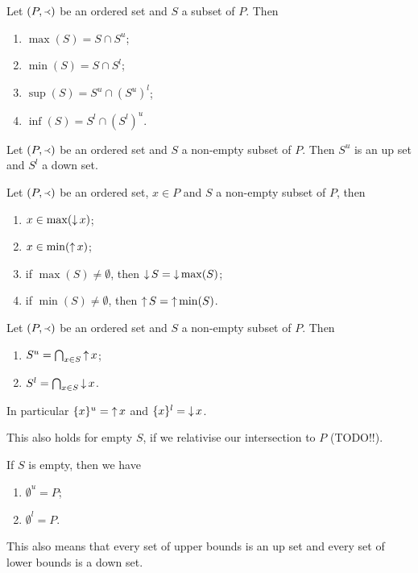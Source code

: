 \begin{lemma}
Let $(P,\Yleft)$ be an ordered set and $S$ a subset of $P$. Then
\begin{enumerate}
\item $\max(S) = S\cap S^u$;
\item $\min(S) = S\cap S^l$;
\item $\sup(S) = S^u\cap (S^u)^l$;
\item $\inf(S) = S^l\cap (S^l)^u$.
\end{enumerate}
\end{lemma}

\begin{lemma}
Let $(P,\Yleft)$ be an ordered set and $S$ a non-empty subset of $P$. Then $S^u$ is an up set and $S^l$ a down set.
\end{lemma}

\begin{lemma} \label{lemma:minMaxUpsetDownset}
Let $(P,\Yleft)$ be an ordered set, $x\in P$ and $S$ a non-empty subset of $P$, then
\begin{enumerate}
\item $x \in \max(\mathop{\downarrow} x)$;
\item $x \in \min(\mathop{\uparrow} x)$;
\item if $\max(S)\neq \emptyset$, then $\mathop{\downarrow} S = \mathop{\downarrow} \max(S)$;
\item if $\min(S)\neq \emptyset$, then $\mathop{\uparrow} S = \mathop{\uparrow} \min(S)$.
\end{enumerate}
\end{lemma}

\begin{lemma} \label{lemma:boundsFromUpDownSets}
Let $(P,\Yleft)$ be an ordered set and $S$ a non-empty subset of $P$. Then
\begin{enumerate}
\item $S^u = \bigcap_{x\in S}\mathop{\uparrow} x$;
\item $S^l = \bigcap_{x\in S}\mathop{\downarrow} x$.
\end{enumerate}
In particular $\{x\}^u = \mathop{\uparrow} x$ and $\{x\}^l = \mathop{\downarrow} x$.

This also holds for empty $S$, if we relativise our intersection to $P$ (TODO!!).

If $S$ is empty, then we have
\begin{enumerate}
\item $\emptyset^u = P$;
\item $\emptyset^l = P$.
\end{enumerate}
\end{lemma}
This also means that every set of upper bounds is an up set and every set of lower bounds is a down set.

